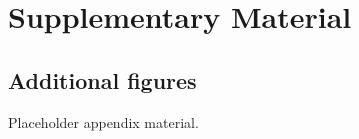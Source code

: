 %
%
%
\appendix
\chapter{Supplementary Material}
\label{sec:appendix}

\section{Additional figures}
\label{sec:appendix_figures}


Placeholder appendix material.
